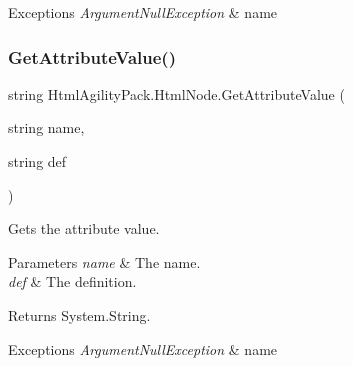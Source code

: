 \begin{DoxyExceptions}{Exceptions}
{\em Argument\+Null\+Exception} & name\\
\hline
\end{DoxyExceptions}
\mbox{\label{class_html_agility_pack_1_1_html_node_aba043cb93effaa267479336fbc68d446}} 
\subsubsection{\texorpdfstring{Get\+Attribute\+Value()}{GetAttributeValue()}\hspace{0.1cm}{\footnotesize\ttfamily [3/3]}}
{\footnotesize\ttfamily string Html\+Agility\+Pack.\+Html\+Node.\+Get\+Attribute\+Value (\begin{DoxyParamCaption}\item[{string}]{name,  }\item[{string}]{def }\end{DoxyParamCaption})\hspace{0.3cm}{\ttfamily [inline]}}



Gets the attribute value. 


\begin{DoxyParams}{Parameters}
{\em name} & The name.\\
\hline
{\em def} & The definition.\\
\hline
\end{DoxyParams}
\begin{DoxyReturn}{Returns}
System.\+String.
\end{DoxyReturn}

\begin{DoxyExceptions}{Exceptions}
{\em Argument\+Null\+Exception} & name\\
\hline
\end{DoxyExceptions}
\mbox{\label{class_html_agility_pack_1_1_html_node_ac81201c1243724141548c7981a70fb56}} 
